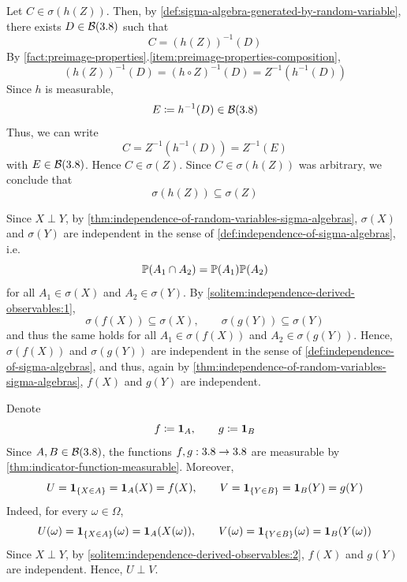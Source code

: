 \pagebreak[3]
\begin{solution}
\leavevmode
\begin{enumerate}[label={\protect\hyperref[exitem:independence-derived-observables:\arabic*]{(\alph*)}}]
\item \label{solitem:independence-derived-observables:1}
Let $C \in \sigma(h(Z))$. %
Then, by \autoref{def:sigma-algebra-generated-by-random-variable}, there exists $D \allowbreak \in \allowbreak \mathcal{B}(3.8)$ such that
\[
C
=
(h(Z))^{-1}(D)
\]
By \autoref{fact:preimage-properties}.\ref{item:preimage-properties-composition},
\[
(h(Z))^{-1}(D)
=
(h \circ Z)^{-1}(D)
=
Z^{-1}(h^{-1}(D))
\]
Since $h$ is measurable, %
\[
E \coloneq h^{-1}(D) \in \mathcal{B}(3.8)
\]
Thus, 
we can write
\[
C
=
Z^{-1}(h^{-1}(D))
=
Z^{-1}(E)
\]
with $E \in \mathcal{B}(3.8)$.
Hence $C \in \sigma(Z)$.
Since $C \in \sigma(h(Z))$ was arbitrary, we conclude that
\[
\sigma(h(Z)) \subseteq \sigma(Z)
\]


\item \label{solitem:independence-derived-observables:2}
Since \(X \perp Y\), by \autoref{thm:independence-of-random-variables-sigma-algebras},  \(\sigma(X)\) and \(\sigma(Y)\) are independent in the sense of \autoref{def:independence-of-sigma-algebras}, i.e.
\[
\mathbb{P}(A_1 \cap A_2)
=
\mathbb{P}(A_1)\mathbb{P}(A_2)
\]
for all \(A_1 \in \sigma(X)\) and \(A_2 \in \sigma(Y)\).
By \ref{solitem:independence-derived-observables:1},
\[
\sigma(f(X)) \subseteq \sigma(X),
\qquad
\sigma(g(Y)) \subseteq \sigma(Y)
\]
and thus 
the same 
 holds for all \(A_1 \in \sigma(f(X))\) and \(A_2 \in \sigma(g(Y))\).
Hence, \(\sigma(f(X))\) and \(\sigma(g(Y))\) are independent in the sense of \autoref{def:independence-of-sigma-algebras},
and thus, again by \autoref{thm:independence-of-random-variables-sigma-algebras},
\(f(X)\) and \(g(Y)\) are independent.

\item \label{solitem:independence-derived-observables:3}
Denote
\[
f \coloneq \mathbf{1}_A,
\qquad
g \coloneq \mathbf{1}_B
\]
Since \(A,B \in \mathcal{B}(3.8)\), the functions \(f,g : 3.8 \to 3.8\) are measurable by \autoref{thm:indicator-function-measurable}.
Moreover,
\[
U
=
\mathbf{1}_{\{X \in A\}}
=
\mathbf{1}_A(X)
=
f(X),
\qquad
V
=
\mathbf{1}_{\{Y \in B\}}
=
\mathbf{1}_B(Y)
=
g(Y)
\]
Indeed, for every \(\omega \in \Omega\),
\[
U(\omega)
=
\mathbf{1}_{\{X \in A\}}(\omega)
=
\mathbf{1}_A(X(\omega)),
\qquad
V(\omega)
=
\mathbf{1}_{\{Y \in B\}}(\omega)
=
\mathbf{1}_B(Y(\omega))
\]
Since $X \perp Y$,
by \ref{solitem:independence-derived-observables:2}, \(f(X)\) and \(g(Y)\) are independent.
Hence, $U \perp V$.
\qedhere
\end{enumerate}
\end{solution}

